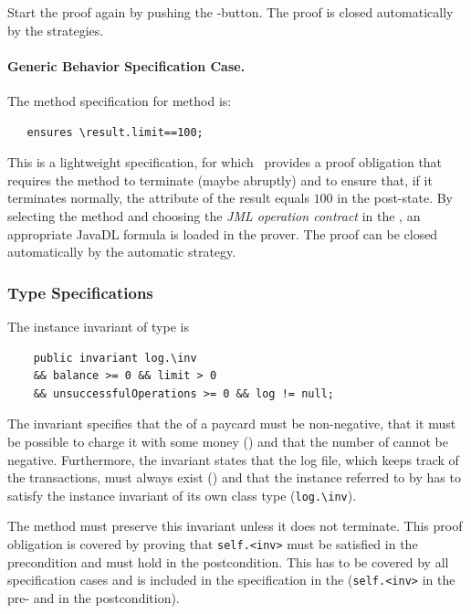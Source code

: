 Start the proof again by pushing the -button. The proof is closed automatically by the
strategies.

\paragraph{Generic Behavior Specification Case.}

The method specification for method  is:
\begin{verbatim}
   ensures \result.limit==100;
\end{verbatim}
This is a lightweight specification, for which \KeY\ provides a proof
obligation that requires the method to terminate (maybe abruptly) and
to ensure that, if it terminates normally, the  attribute of
the result equals $100$ in the post-state. 
By selecting the
method and choosing the \emph{JML operation
  contract} in the \ctCfg, an appropriate JavaDL
formula is loaded in the prover. The proof can be closed automatically
by the automatic strategy.

\subsubsection{Type Specifications}

The instance invariant of type  is
\begin{verbatim}
    public invariant log.\inv 
    && balance >= 0 && limit > 0 
    && unsuccessfulOperations >= 0 && log != null;
\end{verbatim}

The invariant specifies that the  of a paycard must be non-negative, that it must be possible to charge it with some money () and that the number of  cannot be negative. Furthermore, the invariant states that the log file, which keeps track of the transactions, must always exist () and that the instance referred to by  has to satisfy the instance invariant of its own class type (\verb+log.\inv+).  

The method  must preserve this
invariant unless it does not terminate. 
This proof obligation is covered by proving that 
\verb+self.<inv>+ must 
be satisfied in the precondition and must hold in the postcondition.
This has to be covered by all specification cases and is included in 
the specification in the \ctCfg (\verb+self.<inv>+ 
in the pre- and in the postcondition).

